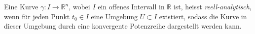 \begin{definition}
%
%
    Eine Kurve $\gamma\colon I \to \mathbb{R}^n$, wobei $I$ ein offenes Intervall in $\mathbb{R}$ ist, heisst \emph{reell-analytisch}, wenn für jeden Punkt $t_{0} \in I$ eine Umgebung $U \subset I$ existiert, sodass die Kurve in dieser Umgebung durch eine konvergente Potenzreihe dargestellt werden kann.
\end{definition}
